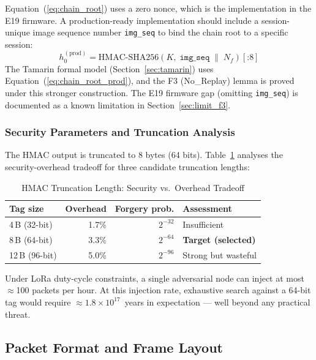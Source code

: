 \documentclass[journal]{IEEEtran}
\begin{document}
Equation~(\ref{eq:chain_root}) uses a zero nonce, which is the implementation
in the E19 firmware.  A production-ready implementation should include a
session-unique image sequence number \texttt{img\_seq} to bind the chain
root to a specific session:
\begin{equation}
  h_0^{(\text{prod})} = \mathrm{HMAC\text{-}SHA256}(K,\;
        \mathtt{img\_seq} \;\|\; N_f)[\text{:}8]
  \label{eq:chain_root_prod}
\end{equation}
The Tamarin formal model (Section~\ref{sec:tamarin}) uses
Equation~(\ref{eq:chain_root_prod}), and the F3 (No\_Replay) lemma is proved
under this stronger construction.  The E19 firmware gap (omitting
\texttt{img\_seq}) is documented as a known limitation in
Section~\ref{sec:limit_f3}.

\subsubsection{Security Parameters and Truncation Analysis}

The HMAC output is truncated to 8 bytes (64 bits).  Table~\ref{tab:hmac_trunc}
analyses the security-overhead tradeoff for three candidate truncation lengths:

\begin{table}[ht]
\centering
\caption{HMAC Truncation Length: Security vs.\ Overhead Tradeoff}
\label{tab:hmac_trunc}
\begin{tabular}{lrrl}
\toprule
Tag size & Overhead & Forgery prob. & Assessment \\
\midrule
4\,B (32-bit) & 1.7\% & $2^{-32}$ & Insufficient \\
8\,B (64-bit) & 3.3\% & $2^{-64}$ & \textbf{Target (selected)} \\
12\,B (96-bit) & 5.0\% & $2^{-96}$ & Strong but wasteful \\
\bottomrule
\end{tabular}
\end{table}

Under LoRa duty-cycle constraints, a single adversarial node can inject at
most $\approx$100 packets per hour.  At this injection rate, exhaustive search
against a 64-bit tag would require $\approx 1.8 \times 10^{17}$~years in
expectation --- well beyond any practical threat.

\subsection{Packet Format and Frame Layout}
\label{sec:pkt_format}
\end{document}
